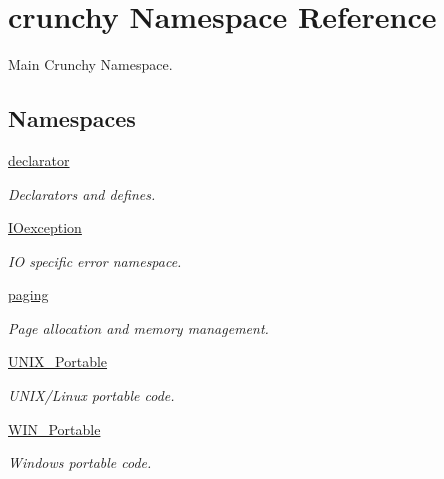 \hypertarget{namespacecrunchy}{}\section{crunchy Namespace Reference}
\label{namespacecrunchy}


Main Crunchy Namespace.  


\subsection*{Namespaces}
\begin{DoxyCompactItemize}
\item 
 \hyperlink{namespacecrunchy_1_1declarator}{declarator}
\begin{DoxyCompactList}\small\item\em Declarators and defines. \end{DoxyCompactList}\item 
 \hyperlink{namespacecrunchy_1_1_i_oexception}{I\+Oexception}
\begin{DoxyCompactList}\small\item\em IO specific error namespace. \end{DoxyCompactList}\item 
 \hyperlink{namespacecrunchy_1_1paging}{paging}
\begin{DoxyCompactList}\small\item\em Page allocation and memory management. \end{DoxyCompactList}\item 
 \hyperlink{namespacecrunchy_1_1_u_n_i_x___portable}{U\+N\+I\+X\+\_\+\+Portable}
\begin{DoxyCompactList}\small\item\em U\+N\+I\+X/\+Linux portable code. \end{DoxyCompactList}\item 
 \hyperlink{namespacecrunchy_1_1_w_i_n___portable}{W\+I\+N\+\_\+\+Portable}
\begin{DoxyCompactList}\small\item\em Windows portable code. \end{DoxyCompactList}\end{DoxyCompactItemize}

